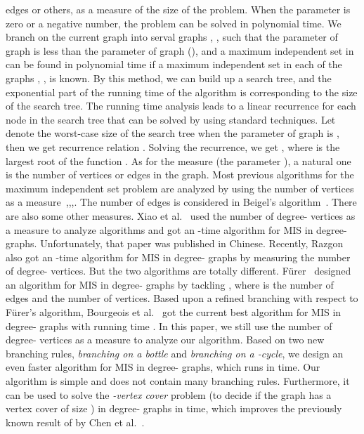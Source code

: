 \documentclass[runningheads]{llncs}
\begin{document}
edges or others, as a measure of the size of the problem. When the
parameter is zero or a negative number, the problem can be solved
in polynomial time. We branch on the current graph  into serval
graphs , ,  such that the parameter 
of graph  is less than the parameter  of graph 
(), and a maximum independent set in  can be
found in polynomial time if a maximum independent set in each of
the  graphs , ,  is known. By this
method, we can build up a search tree, and the exponential part of
the running time of the algorithm is corresponding to the size of
the search tree. The running time analysis leads to a linear
recurrence for each node in the search tree that can be solved by
using standard techniques. Let  denote the worst-case size
of the search tree when the parameter of graph  is , then we
get recurrence relation . Solving
the recurrence, we get , where  is the largest
root of the function . As for the
measure (the parameter ), a natural one is the number of
vertices or edges in the graph. Most previous algorithms for the
maximum independent set problem are analyzed by using the number
of vertices as a
measure~\cite{Tarjan:IS},\cite{Jian:Is},\cite{Robson:IS},\cite{Fomin:is}.
The number of edges is considered in Beigel's
algorithm~\cite{Beigel:is}. There are also some other measures.
Xiao et al.~\cite{xiao:IS3} used the number of degree- vertices
as a measure to analyze algorithms and got an -time
algorithm for MIS in degree- graphs. Unfortunately, that paper
was published in Chinese. Recently, Razgon~\cite{Razgon:3IS} also
got an -time algorithm for MIS in degree- graphs
by measuring the number of degree- vertices. But the two
algorithms are totally different. F{\"u}rer~\cite{Furer:ISsparse}
designed an algorithm for MIS in degree- graphs by tackling
, where  is the number of edges and  the number of
vertices. Based upon a refined branching with respect to
F{\"u}rer's algorithm, Bourgeois et al.~\cite{Bourgeois:3IS} got
the current best algorithm for MIS in degree- graphs with
running time . In this paper, we still use the
number of degree- vertices as a measure to analyze our
algorithm. Based on two new branching rules, \emph{branching on a
bottle} and \emph{branching on a -cycle}, we design an even
faster algorithm for MIS in degree- graphs, which runs in
 time. Our algorithm is simple and does not contain
many branching rules. Furthermore, it can be used to solve the
\emph{-vertex cover} problem (to decide if the graph has a
vertex cover of size ) in degree- graphs in 
time, which improves the previously known result of
 by Chen et al.~\cite{Chen:labeled3vc}.
\end{document}
